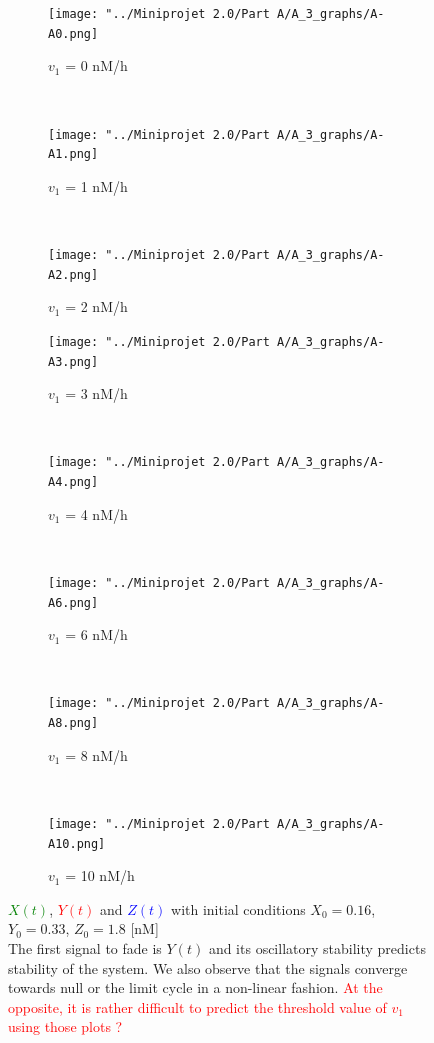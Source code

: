 \documentclass[10pt,a4paper,oneside,twocolumn]{article}
\newcommand{\red}[1]{\textcolor{red}{#1}}
\newcommand{\blue}[1]{\textcolor{blue}{#1}}
\newcommand{\green}[1]{\textcolor{green}{#1}}
\numberwithin{equation}{section} %
\begin{document}
    \begin{figure}
    \centering
	\begin{subfigure}[b]{0.32\textwidth}
	    \texttt{[image: "../Miniprojet 2.0/Part A/A\_3\_graphs/A-A0.png]}
	    \caption{$v_1$ = 0 nM/h}
	    \end{subfigure}
	    ~ 
	    \begin{subfigure}[b]{0.32\textwidth}
	    \texttt{[image: "../Miniprojet 2.0/Part A/A\_3\_graphs/A-A1.png]}
	    \caption{$v_1$ = 1 nM/h}
	    \end{subfigure}
	    ~ 
	\begin{subfigure}[b]{0.32\textwidth}
	    \texttt{[image: "../Miniprojet 2.0/Part A/A\_3\_graphs/A-A2.png]}
	    \caption{$v_1$ = 2 nM/h}
	\end{subfigure}
	 
	\begin{subfigure}[b]{0.32\textwidth}
	    \texttt{[image: "../Miniprojet 2.0/Part A/A\_3\_graphs/A-A3.png]}
	    \caption{$v_1$ = 3 nM/h}
	\end{subfigure}
	~ 
	\begin{subfigure}[b]{0.32\textwidth}
	    \texttt{[image: "../Miniprojet 2.0/Part A/A\_3\_graphs/A-A4.png]}
	    \caption{$v_1$ = 4 nM/h}
	\end{subfigure}
	~
	\begin{subfigure}[b]{0.32\textwidth}
	    \texttt{[image: "../Miniprojet 2.0/Part A/A\_3\_graphs/A-A6.png]}
	    \caption{$v_1$ = 6 nM/h}
	\end{subfigure}
	~ 
	\begin{subfigure}[b]{0.32\textwidth}
	    \texttt{[image: "../Miniprojet 2.0/Part A/A\_3\_graphs/A-A8.png]}
	    \caption{$v_1$ = 8 nM/h}
	\end{subfigure}
	~
	\begin{subfigure}[b]{0.32\textwidth}
	    \texttt{[image: "../Miniprojet 2.0/Part A/A\_3\_graphs/A-A10.png]}
	    \caption{$v_1$ = 10 nM/h}
	\end{subfigure}

	\caption{\green{$X(t)$}, \red{$Y(t)$} and \blue{$Z(t)$} with initial conditions $X_0 = 0.16$, $Y_0 = 0.33 $, $Z_0 = 1.8$ [nM]\\
	The first signal to fade is $Y(t)$ and its oscillatory stability predicts stability of the system. We also observe that the signals converge towards null or the limit cycle in a non-linear fashion. \red{At the opposite, it is rather difficult to predict the threshold value of $v_1$ using those plots ?}}
    \end{figure}
\end{document}
